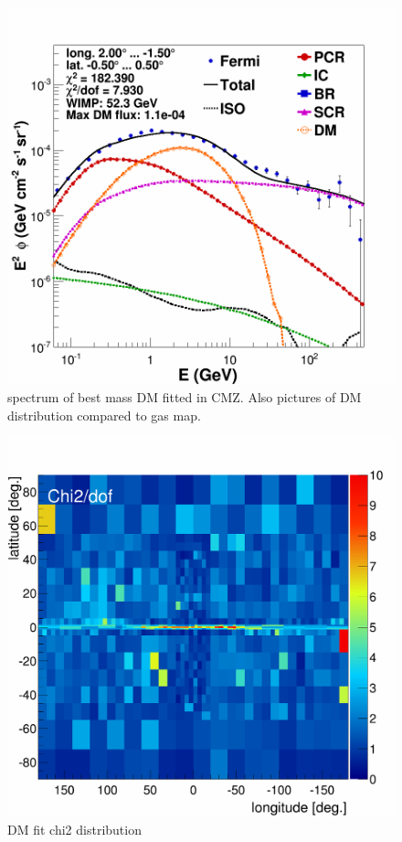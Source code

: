 \begin{figure}
  \centering
  \includegraphics[width=.9\linewidth]{pic/results/DMonly_CMZ.png}
  \caption{spectrum of best mass DM fitted in CMZ. Also pictures of DM distribution compared to gas map.}
  \label{fig:DMonly_CMZ}
\end{figure}

\begin{figure}
  \centering
  \includegraphics[width=.9\linewidth]{pic/results/DMonly_chi2Distribution.png}
  \caption{DM fit chi2 distribution}
  \label{fig:DMonly_chi2Distribution}
\end{figure}

